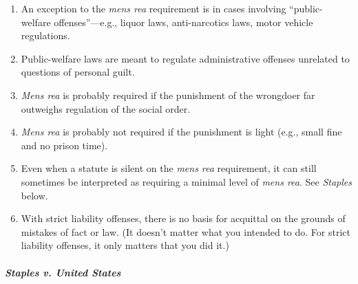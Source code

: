 \begin{enumerate}
    \item An exception to the \emph{mens rea} requirement is in cases involving ``public-welfare offenses''---e.g., liquor laws, anti-narcotics laws, motor vehicle regulations.
    \item Public-welfare laws are meant to regulate administrative offenses unrelated to questions of personal guilt.
    \item \emph{Mens rea} is probably required if the punishment of the wrongdoer far outweighs regulation of the social order.
    \item \emph{Mens rea} is probably not required if the punishment is light (e.g., small fine and no prison time).
    \item Even when a statute is silent on the \emph{mens rea} requirement, it can still sometimes be interpreted as requiring a minimal level of \emph{mens rea}. See \emph{Staples} below.
    \item With strict liability offenses, there is no basis for acquittal on the grounds of mistakes of fact or law. (It doesn't matter what you intended to do. For strict liability offenses, it only matters that you did it.)
\end{enumerate}

\paragraph{\emph{Staples v. United States}}

